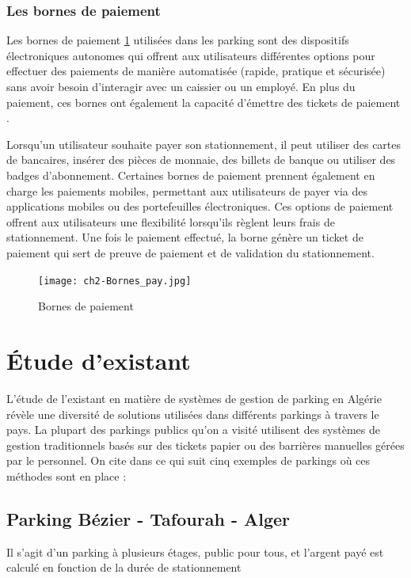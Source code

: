 \subsubsection{Les bornes de paiement}
Les bornes de paiement \ref{img1} utilisées dans les parking sont des dispositifs électroniques autonomes qui offrent aux utilisateurs différentes options pour effectuer des paiements de manière automatisée (rapide, pratique et sécurisée) sans avoir besoin d'interagir avec un caissier ou un employé. En plus du paiement, ces bornes ont également la capacité d'émettre des tickets de paiement \cite{ch2_Transpor19}.

Lorsqu'un utilisateur souhaite payer son stationnement, il peut utiliser des cartes de bancaires, insérer des pièces de monnaie, des billets de banque ou utiliser des badges d'abonnement. Certaines bornes de paiement prennent également en charge les paiements mobiles, permettant aux utilisateurs de payer via des applications mobiles ou des portefeuilles électroniques. Ces options de paiement offrent aux utilisateurs une flexibilité lorsqu'ils règlent leurs frais de stationnement.
Une fois le paiement effectué, la borne génère un ticket de paiement qui sert de preuve de paiement et de validation du stationnement.

\begin{figure}[H]
	\centering
	\texttt{[image: ch2-Bornes\_pay.jpg]}
	\caption{ Bornes de paiement}
 \label{img1}
\end{figure}

\section{Étude d'existant}

L'étude de l'existant en matière de systèmes de gestion de parking en Algérie révèle une diversité de solutions utilisées dans différents parkings à travers le pays. La plupart des parkings publics qu'on a visité utilisent des systèmes de gestion traditionnels basés sur des tickets papier ou des barrières manuelles gérées par le personnel.
On cite dans ce qui suit cinq exemples de parkings où ces méthodes sont en place :
\subsection{Parking Bézier - Tafourah - Alger}



Il s'agit d'un parking à plusieurs étages, public pour tous, et l'argent payé est calculé en fonction de la durée de stationnement

